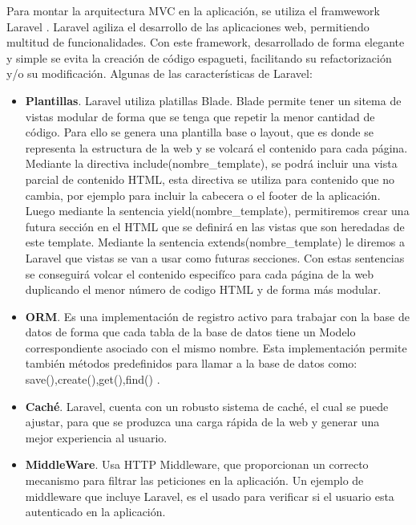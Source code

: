 \vspace{5 mm}

Para montar la arquitectura MVC en la aplicación, se utiliza el framwework Laravel \cite{laravel-doc}. Laravel agiliza el desarrollo de las aplicaciones
web, permitiendo multitud de funcionalidades. Con este framework, desarrollado de forma elegante y simple se evita la creación de código espagueti,
facilitando su refactorización y/o su modificación. Algunas de las características de Laravel:


\begin{itemize}

\item \textbf{Plantillas}. Laravel utiliza platillas Blade. Blade permite tener un sitema de vistas modular de forma que se tenga que repetir la menor
cantidad de código. Para ello se genera una plantilla base o layout, que es donde se representa la estructura de la web y se volcará el contenido para
cada página. Mediante la directiva include(nombre\_template), se podrá incluir una vista parcial de contenido HTML, esta directiva se utiliza para
contenido que no cambia, por ejemplo para incluir la cabecera o el footer de la aplicación. Luego mediante la sentencia yield(nombre\_template),
permitiremos crear una futura sección en el HTML que se definirá en las vistas que son heredadas de este template. Mediante la sentencia
extends(nombre\_template) le diremos a Laravel que vistas se van a usar como futuras secciones. Con estas sentencias se conseguirá volcar el
contenido especifíco para cada página de la web duplicando el menor número de codigo HTML y de forma más modular.

\item \textbf{ORM}. Es una implementación de registro activo para trabajar con la base de datos de forma que cada tabla de la base de datos tiene un
Modelo correspondiente asociado con el mismo nombre. Esta implementación permite también métodos predefinidos para llamar a la base de datos como:
save(),create(),get(),find() \cite{eloquent-orm}.

\item \textbf{Caché}. Laravel, cuenta con un robusto sistema de caché, el cual se puede ajustar, para que se produzca una carga rápida de la web y
generar una mejor experiencia al usuario.

\item \textbf{MiddleWare}. Usa HTTP Middleware, que proporcionan un correcto mecanismo para filtrar las peticiones en la aplicación. Un ejemplo de
middleware que incluye Laravel, es el usado para verificar si el usuario esta autenticado en la aplicación.

\end{itemize}

